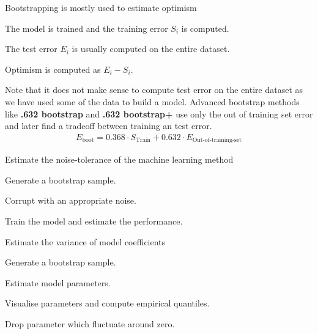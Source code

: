 \documentclass[landscape,footrule]{foils}
\begin{document}
 
Bootstrapping is mostly used to estimate optimism
\begin{triangles}
\item The model is trained and the training error $S_i$ is computed.
\item The test error $E_i$ is usually computed on the entire dataset.
\item Optimism is computed as $E_i-S_i$.
\end{triangles}

\bigskip

Note that it does not make sense to compute test error on the entire dataset as we have used some of the data to build a model. Advanced bootstrap methods like \textbf{.632 bootstrap} and \textbf{.632 bootstrap+} use only the out of training set error and later find a tradeoff between training an test error.
\begin{align*}
E_{\text{boot}}=0.368\cdot S_{\text{Train}} + 0.632\cdot E_{\text{Out-of-training-set}}
\end{align*}


Estimate the noise-tolerance of the machine learning method
\begin{triangles}
\item Generate a bootstrap sample.
\item Corrupt with an appropriate noise.
\item Train the model and estimate the performance.
\end{triangles}
\vspace*{2cm}

Estimate the variance of model coefficients
\begin{triangles}
\item Generate a bootstrap sample.
\item Estimate model parameters.
\item Visualise parameters and compute empirical quantiles.
\item Drop parameter which fluctuate around zero.
\end{triangles}
\end{document}
